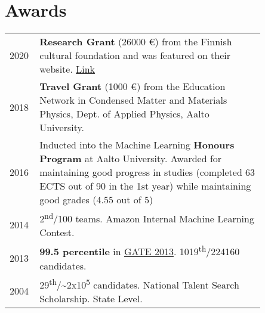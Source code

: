 \documentclass[]{deedy-resume}
\begin{document}
\begin{minipage}[t]{0.62\textwidth}

	


\section{Awards} 
\begin{tabular}{p{0.05\linewidth}p{0.8\linewidth}}
2020 & \textbf{Research Grant} (26000 €) from the Finnish cultural foundation and was featured on their website. \href{https://skr.fi/en/whats-new/five-hundred-full-year-grants-cultural-foundation}{Link}\\
2018 & \textbf{Travel Grant} (1000 €) from the Education Network in Condensed Matter and Materials Physics, Dept. of Applied Physics, Aalto University.\\
2016  & Inducted into the Machine Learning \textbf{Honours Program} at Aalto University. Awarded for maintaining good progress in studies (completed 63 ECTS out of 90 in the 1st year) while maintaining good grades (4.55 out of 5)\\ 
2014  & 2\textsuperscript{nd}/100 teams. Amazon Internal Machine Learning Contest. \\%
2013  & \textbf{99.5 percentile}  in \href{http://www.gate.iitb.ac.in/gate2013/cs-syllabus/}{GATE 2013}. 1019\textsuperscript{th}/224160 candidates.\\
2004  & 29\textsuperscript{th}/\textasciitilde2x10\textsuperscript{5} candidates. National Talent Search Scholarship. State Level.\\

\end{tabular}
\sectionsep



\end{minipage}
\end{document}
